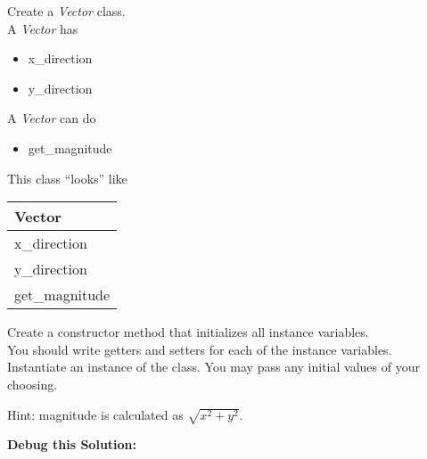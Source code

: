 \documentclass{article}
\begin{document}
\begin{enumerate}

	\begin{minipage}{.6\textwidth}
	\item Create a \textit{Vector} class.\\
		A \textit{Vector} has
		\begin{itemize}
			\item x\_direction 
			\item y\_direction
		\end{itemize}
		
		A \textit{Vector} can do
		\begin{itemize}
			\item get\_magnitude
		\end{itemize}
	\end{minipage}
	\begin{minipage}{.4\textwidth}
		This class ``looks'' like 
				
		\vspace*{1em}
		\begin{tabular}{|l|}
			\hline Vector\\ \hline
			x\_direction\\ y\_direction\\ \hline
			get\_magnitude\\  \hline
		\end{tabular}
	\end{minipage}

	\vspace*{2ex}
	Create a constructor method that initializes all instance variables.\\
	You should write getters and setters for each of the instance variables.\\
	Instantiate an instance of the class. You may pass any initial values of your choosing.
	
	Hint: magnitude is calculated as $\sqrt{x^2 + y^2}$.

		\textbf{Debug this Solution:}\\
		\mbox{ \hspace*{0.25in}	}

\pagebreak





\end{enumerate}
\end{document}
